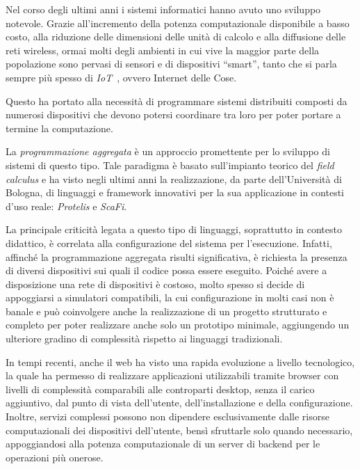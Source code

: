 \label{ch:intro}

Nel corso degli ultimi anni i sistemi informatici hanno avuto uno sviluppo notevole.
Grazie all'incremento della potenza computazionale disponibile a basso costo, alla riduzione delle dimensioni delle unità di calcolo e alla diffusione delle reti wireless,
ormai molti degli ambienti in cui vive la maggior parte della popolazione sono pervasi di sensori e di dispositivi ``smart'', tanto che si parla sempre più spesso di \emph{IoT}~\cite{ashton2009internet}, ovvero Internet delle Cose.

Questo ha portato alla necessità di programmare sistemi distribuiti composti da numerosi dispositivi che devono potersi coordinare tra loro
per poter portare a termine la computazione.

La \emph{programmazione aggregata} è un approccio promettente per lo sviluppo di sistemi di questo tipo.
Tale paradigma è basato sull'impianto teorico del \emph{field calculus} e ha visto negli ultimi anni la realizzazione,
da parte dell'Università di Bologna, di linguaggi e framework innovativi per la sua applicazione in contesti d'uso reale:
\emph{Protelis} e \emph{ScaFi}.

La principale criticità legata a questo tipo di linguaggi, soprattutto in contesto didattico, è correlata alla configurazione del sistema per l'esecuzione.
Infatti, affinché la programmazione aggregata risulti significativa, è richiesta la presenza di diversi dispositivi sui quali il codice possa essere eseguito.
Poiché avere a disposizione una rete di dispositivi è costoso, molto spesso si decide di appoggiarsi a simulatori compatibili,
la cui configurazione in molti casi non è banale e può coinvolgere anche la realizzazione di un progetto strutturato e completo per poter realizzare anche solo un prototipo minimale,
aggiungendo un ulteriore gradino di complessità rispetto ai linguaggi tradizionali.

In tempi recenti, anche il web ha visto una rapida evoluzione a livello tecnologico,
la quale ha permesso di realizzare applicazioni utilizzabili tramite browser con livelli di complessità comparabili alle controparti desktop,
senza il carico aggiuntivo, dal punto di vista dell'utente, dell'installazione e della configurazione.
Inoltre, servizi complessi possono non dipendere esclusivamente dalle risorse computazionali dei dispositivi dell'utente,
bensì sfruttarle solo quando necessario, appoggiandosi alla potenza computazionale di un server di backend per le operazioni più onerose.

